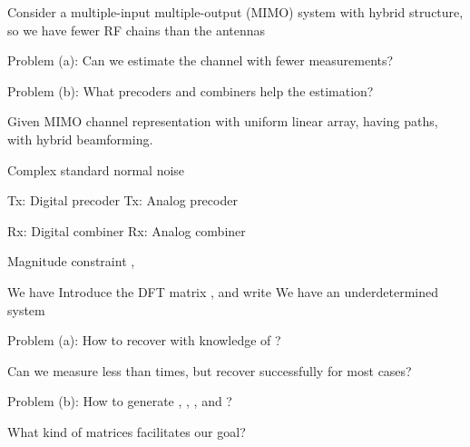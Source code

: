 
\Title {\TitleText}
\blank [big]

\Subtitle {\AuthorText}
\blank [big]

\Subsubtitle {\InstitutionText}

\page [yes]
{
\blank [big]

\I Consider a multiple-input multiple-output (MIMO) system with hybrid structure, so we have fewer RF chains than the antennas

\I Problem (a): Can we estimate the channel with fewer measurements?

\I Problem (b): What precoders and combiners help the estimation?
}
{
\I Given MIMO channel representation  with uniform linear array, having  paths, with hybrid beamforming.

\I Complex standard normal noise 

\I Tx: Digital precoder 
\I Tx: Analog precoder 

\I Rx: Digital combiner 
\I Rx: Analog combiner 

\I Magnitude constraint , 
}
{
\I We have 
\I Introduce the DFT matrix , and write
\I We have an underdetermined system 
}
{
\I Problem (a): How to recover  with knowledge of ?

Can we measure less than  times, but recover successfully for most cases?

\I Problem (b): How to generate , , , and ?

What kind of matrices facilitates our goal?
}
